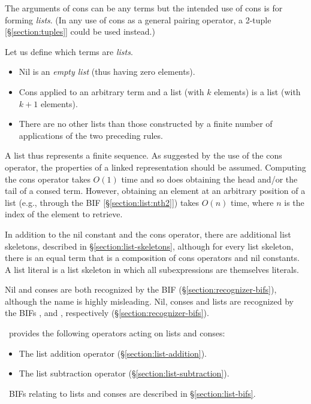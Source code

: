 The arguments of cons can be any terms but the intended use of cons is
for forming \emph{lists}. (In any use of cons as a general pairing operator, a 2-tuple
[\S\ref{section:tuples}] could be used instead.)

Let us define which terms are \emph{lists}.
\begin{itemize}
\item Nil is an \emph{empty list} (thus having zero elements).
\item Cons applied to an arbitrary term and a list (with $k$ elements) is a list
(with $k+1$ elements).
\item There are no other lists than those constructed by
a finite number of applications of the two preceding rules.
\end{itemize}
A list thus represents a finite sequence.  As suggested by the use of
the cons operator, the properties of a linked representation should be
assumed.  Computing the cons operator takes $O(1)$ time and so does
obtaining the head and/or the tail of a consed term.  However,
obtaining an element at an arbitrary position of a list
\ifStd (e.g., through the BIF  [\S\ref{section:list:nth2}]) \fi
takes $O(n)$ time, where $n$ is the index of the element to retrieve.

In addition to the nil constant and the cons operator, there are
additional list skeletons, described in
\S\ref{section:list-skeletons}, although for every list skeleton, there is an
equal term that is a composition of cons operators and nil constants.
A list literal is a list skeleton in which all subexpressions are
themselves literals.

\ifOld
Nil and conses are both recognized by the BIF  (\S\ref{section:recognizer-bifs}),
although the name is highly misleading.
\fi
\ifStd
Nil, conses and lists are recognized by the BIFs ,
 and , respectively (\S\ref{section:recognizer-bifs}).
\fi

\Erlang\ provides the following operators acting on lists and conses:
\begin{itemize}
\item The list addition operator \T{++} (\S\ref{section:list-addition}).
\item The list subtraction operator \T{--} (\S\ref{section:list-subtraction}).
\end{itemize}
\Erlang\ BIFs relating to lists and conses are described in \S\ref{section:list-bifs}.

